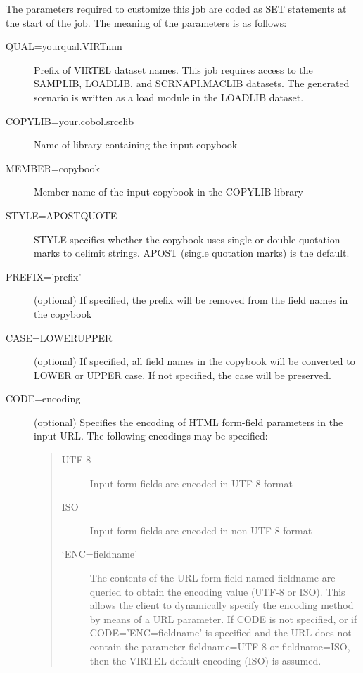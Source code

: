 \documentclass[letterpaper,10pt,english]{sphinxmanual}
\begin{document}
The parameters required to customize this job are coded as SET statements at the start of the job. The meaning of the parameters is as follows:
\begin{description}
\item[{QUAL=yourqual.VIRTnnn}] \leavevmode
Prefix of VIRTEL dataset names. This job requires access to the SAMPLIB, LOADLIB, and SCRNAPI.MACLIB datasets. The generated scenario is written as a load module in the LOADLIB dataset.

\item[{COPYLIB=your.cobol.srcelib}] \leavevmode
Name of library containing the input copybook

\item[{MEMBER=copybook}] \leavevmode
Member name of the input copybook in the COPYLIB library

\item[{STYLE=APOST\textbar{}QUOTE}] \leavevmode
STYLE specifies whether the copybook uses single or double quotation marks to delimit strings. APOST (single quotation marks) is the default.

\item[{PREFIX=’prefix’}] \leavevmode
(optional) If specified, the prefix will be removed from the field names in the copybook

\item[{CASE=LOWER\textbar{}UPPER}] \leavevmode
(optional) If specified, all field names in the copybook will be converted to LOWER or UPPER case. If not specified, the case will be preserved.

\item[{CODE=encoding}] \leavevmode
(optional) Specifies the encoding of HTML form-field parameters in the input URL. The following encodings may be specified:-
\begin{quote}
\begin{description}
\item[{UTF-8}] \leavevmode
Input form-fields are encoded in UTF-8 format

\item[{ISO}] \leavevmode
Input form-fields are encoded in non-UTF-8 format

\item[{‘ENC=fieldname’}] \leavevmode
The contents of the URL form-field named fieldname are queried to obtain the encoding value (UTF-8 or ISO). This allows the client to dynamically specify the encoding method by means of a URL parameter. If CODE is not specified, or if CODE=’ENC=fieldname’ is specified and the URL does not contain the parameter fieldname=UTF-8 or fieldname=ISO, then the VIRTEL default encoding (ISO) is assumed.


\end{description}
\end{quote}
\end{description}
\end{document}
